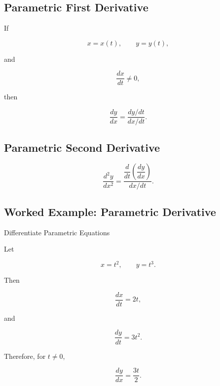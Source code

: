 \subsection{Parametric First Derivative}
\label{subsec:parametric-first-derivative}

If

\[
x=x(t),
\qquad
y=y(t),
\]

and

\[
\frac{dx}{dt}\neq0,
\]

then

\[
\boxed{
\frac{dy}{dx}
=
\frac{
dy/dt
}{
dx/dt
}.
}
\]

\subsection{Parametric Second Derivative}
\label{subsec:parametric-second-derivative}

\[
\boxed{
\frac{d^2y}{dx^2}
=
\frac{
\dfrac{d}{dt}
\left(
\dfrac{dy}{dx}
\right)
}{
dx/dt
}.
}
\]

\subsection{Worked Example: Parametric Derivative}
\label{subsec:worked-parametric-derivative}

\begin{workedexamplebox}{Differentiate Parametric Equations}

Let

\[
x=t^2,
\qquad
y=t^3.
\]

Then

\[
\frac{dx}{dt}=2t,
\]

and

\[
\frac{dy}{dt}=3t^2.
\]

Therefore, for \(t\neq0\),

\begin{answerbox}
\[
\boxed{
\frac{dy}{dx}
=
\frac{3t}{2}.
}
\]
\end{answerbox}

\end{workedexamplebox}

